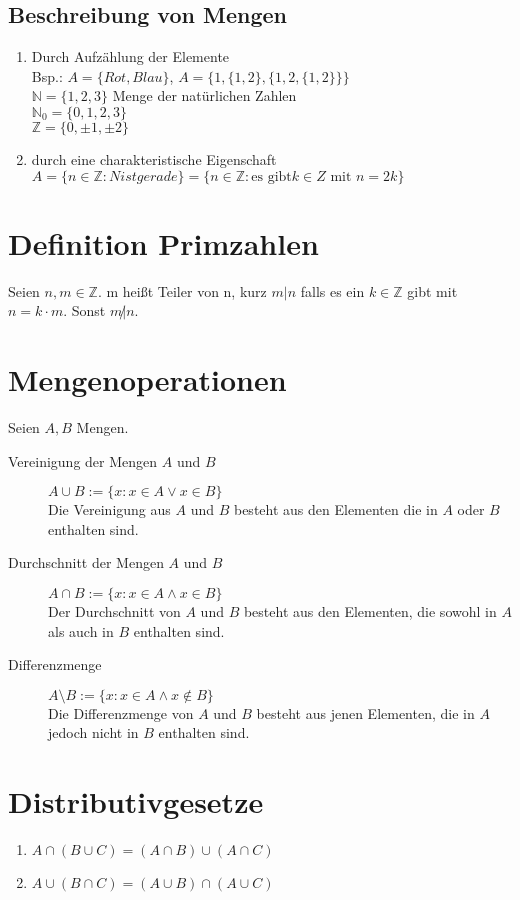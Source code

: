 \subsection{Beschreibung von Mengen}
\begin{enumerate}
\item Durch Aufzählung der Elemente\\
Bsp.: $A = \{Rot, Blau\}$, $A = \{1, \{1, 2\}, \{1, 2,\{1, 2\} \}\}$\\
$\mathbb{N} = \{1, 2, 3\}$ Menge der natürlichen Zahlen\\
$\mathbb{N}_0 = \{0, 1, 2, 3\}$\\
$\mathbb{Z} = \{0, \pm 1, \pm 2\}$
\item durch eine charakteristische Eigenschaft\\
$A = \{n \in \mathbb{Z}: N ist gerade\} = \{n \in \mathbb{Z}: \text{es gibt} k \in Z \text{ mit } n = 2k\}$
\end{enumerate}
\section{Definition Primzahlen}
Seien $n, m \in \mathbb{Z}$. m heißt Teiler von n, kurz $m | n$ falls es ein $k \in \mathbb{Z}$ gibt mit $n = k \cdot m$. Sonst $m \not | n$.
\section{Mengenoperationen}
Seien $A, B$ Mengen.
\begin{description}
\item[Vereinigung der Mengen $A$ und $B$]{$A \cup B := \{x: x \in A \vee x\in B\}$\\
Die Vereinigung aus $A$ und $B$ besteht aus den Elementen die in $A$ oder $B$ enthalten sind.}
\item[Durchschnitt der Mengen $A$ und $B$] {$A \cap B := \{x: x \in A \wedge x \in B\}$\\
Der Durchschnitt von $A$ und $B$ besteht aus den Elementen, die sowohl in $A$ als auch in $B$ enthalten sind.}
\item[Differenzmenge]{$A \setminus B := \{x: x \in A \wedge x \notin B\}$\\
Die Differenzmenge von $A$ und $B$ besteht aus jenen Elementen, die in $A$ jedoch nicht in $B$ enthalten sind.}
\end{description}
\section{Distributivgesetze}
\begin{enumerate}
\item $A \cap (B \cup C) = (A \cap B) \cup (A \cap C)$
\item $A \cup (B \cap C) = (A \cup B) \cap (A \cup C)$
\end{enumerate}
